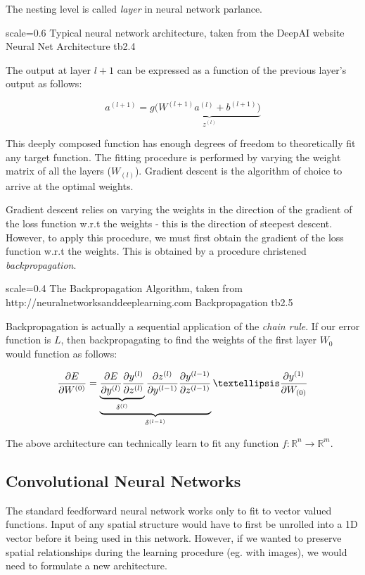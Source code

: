 The nesting level is called \emph{layer} in neural network parlance. 

{scale=0.6}%
{Typical neural network architecture, taken from the DeepAI website}%
{Neural Net Architecture}%
{tb2.4} %

The output at layer $l+1$ can be expressed as a function of the previous layer's output as follows:

\[a^{(l+1)} = g(\underbrace{W^{(l+1)}a^{(l)} + b^{(l+1)})}_{z^{(l)}}\]

This deeply composed function has enough degrees of freedom to theoretically fit any target function. The fitting procedure is performed by varying the weight matrix of all the layers ($W_{(l)}$). Gradient descent is the algorithm of choice to arrive at the optimal weights.

Gradient descent relies on varying the weights in the direction of the gradient of the loss function w.r.t the weights - this is the direction of steepest descent. However, to apply this procedure, we must first obtain the gradient of the loss function w.r.t the weights. This is obtained by a procedure christened \emph{backpropagation}.

{scale=0.4}%
{The Backpropagation Algorithm, taken from http://neuralnetworksanddeeplearning.com }%
{Backpropagation}%
{tb2.5} %

Backpropagation is actually a sequential application of the \emph{chain rule}. 
If our error function is $L$, then backpropagating to find the weights of the first layer $W_0$ would function as follows:

\[\frac{\partial E}{\partial W^{(0)}} =  \underbrace{\underbrace{\frac{\partial E}{\partial y^{(l)}} \frac{\partial y^{(l)}}{\partial z^{(l)}}}_{\delta^{(l)}} \frac{\partial z^{(l)}}{\partial y^{(l-1)}} \frac{\partial y^{(l-1)}}{\partial z^{(l-1)}}}_{\delta^{(l-1)}} \textellipsis \frac{\partial y^{(1)}}{\partial W_{(0)}}\]

The above architecture can technically learn to fit any function 
$f: \mathbb{R}^n \rightarrow \mathbb{R}^m $.

\subsection{Convolutional Neural Networks}
The standard feedforward neural network works only to fit to vector valued functions. Input of any spatial structure would have to first be unrolled into a 1D vector before it being used in this network. However, if we wanted to preserve spatial relationships during the learning procedure (eg. with images), we would need to formulate a new architecture.

